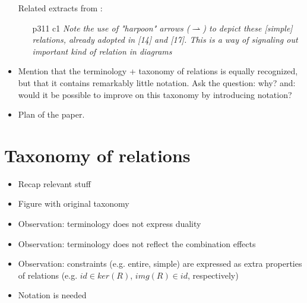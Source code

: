 \documentclass[runningheads,a4paper]{llncs}
\begin{document}
\begin{itemize}
Related extracts from \cite{DBLP:journals/tse/OliveiraF13}:
\begin{itemize}
  \item[p311 c1] \it{Note the use of "harpoon" arrows ($\rightharpoonup$) to depict these [simple] relations, already adopted in [14] and [17]. This is a way of signaling out important kind of relation in diagrams}
\end{itemize}

\item Mention that the terminology + taxonomy of relations is equally recognized, but that it contains remarkably little notation. Ask the question: why? and: would it be possible to improve on this taxonomy by introducing notation?
\item Plan of the paper.
\end{itemize}

\section{Taxonomy of relations}

\begin{itemize}
\item Recap relevant stuff
\item Figure with original taxonomy
\item Observation: terminology does not express duality
\item Observation: terminology does not reflect the combination effects
\item Observation: constraints (e.g. entire, simple) are expressed as extra properties of relations (e.g. $id \in ker(R)$, $img(R) \in id$, respectively)
\item Notation is needed
\end{itemize}
\end{document}
